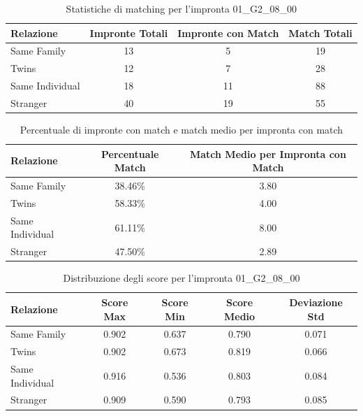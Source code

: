 \begin{table}[htbp]
\centering
\caption{Statistiche di matching per l'impronta 01\_G2\_08\_00}
\label{tab:results_01_G2_08_00}
\begin{tabular}{|l|c|c|c|}
\hline
\textbf{Relazione} & \textbf{Impronte Totali} & \textbf{Impronte con Match} & \textbf{Match Totali} \\
\hline
Same Family & 13 & 5 & 19 \\
\hline
Twins & 12 & 7 & 28 \\
\hline
Same Individual & 18 & 11 & 88 \\
\hline
Stranger & 40 & 19 & 55 \\
\hline
\end{tabular}
\end{table}


\begin{table}[htbp]
\centering
\caption{Percentuale di impronte con match e match medio per impronta con match}
\label{tab:match_percentage_01_G2_08_00}
\begin{tabular}{|l|c|c|}
\hline
\textbf{Relazione} & \textbf{Percentuale Match} & \textbf{Match Medio per Impronta con Match} \\
\hline
Same Family & 38.46\% & 3.80 \\
\hline
Twins & 58.33\% & 4.00 \\
\hline
Same Individual & 61.11\% & 8.00 \\
\hline
Stranger & 47.50\% & 2.89 \\
\hline
\end{tabular}
\end{table}


\begin{table}[htbp]
\centering
\caption{Distribuzione degli score per l'impronta 01\_G2\_08\_00}
\label{tab:scores_01_G2_08_00}
\begin{tabular}{|l|c|c|c|c|}
\hline
\textbf{Relazione} & \textbf{Score Max} & \textbf{Score Min} & \textbf{Score Medio} & \textbf{Deviazione Std} \\
\hline
Same Family & 0.902 & 0.637 & 0.790 & 0.071 \\
\hline
Twins & 0.902 & 0.673 & 0.819 & 0.066 \\
\hline
Same Individual & 0.916 & 0.536 & 0.803 & 0.084 \\
\hline
Stranger & 0.909 & 0.590 & 0.793 & 0.085 \\
\hline
\end{tabular}
\end{table}

